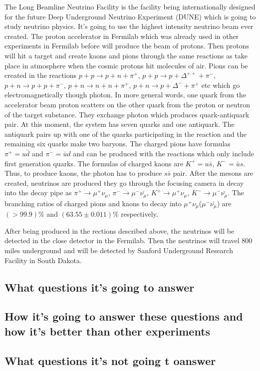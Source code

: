 The Long Beamline Neutrino Facility is the facility being internationally designed for the future Deep Underground Neutrino Experiment (DUNE) which is going to study neutrino physics. It's going to use the highest intensity neutrino beam ever created. The proton accelerator in Fermilab which was already used in other experiments in Fermilab before will produce the beam of protons. Then protons will hit a target and create kaons and pions through the same reactions as take place in atmosphere when the cosmic protons hit molecules of air.  Pions can be created in the reactions $p+p \rightarrow p+n+\pi^+$, $p+p \rightarrow p+\Delta^{++}+\pi^-$, $p+n \rightarrow p+p+\pi^-$, $p+n \rightarrow n+n+\pi^+$, $p+n \rightarrow p+\Delta^{-}+\pi^+$ etc which go electromagnetically though photon. In more general words, one quark from the accelerator beam proton scatters on the other quark from the proton or neutron of the target substance. They exchange photon which produces quark-antiquark pair. At this moment, the system has seven quarks and one antiquark. The antiquark pairs up with one of the quarks participating in the reaction and the remaining six quarks make two baryons.  The charged pions have formulas $\pi^+ = u\bar{d}$ and $\pi^- = \bar{u}d$ and can be produced with the reactions which only include first generation quarks. The formulas of charged kaons are $K^+ = u\bar{s}$, $K^- = \bar{u}s$. Thus, to produce kaons, the photon has to produce $s\bar{s}$ pair. 
After the mesons are created, neutrinos are produced they go through the focusing camera in decay into the decay pipe as $\pi^+ \rightarrow \mu^+\nu_\mu$, $\pi^- \rightarrow \mu^-\bar{\nu_\mu}$, $K^+ \rightarrow \mu^+\nu_\mu$, $K^- \rightarrow \mu^-\bar{\nu_\mu}$. The branching ratios of charged pions and kaons to decay into $\mu^+\nu_\mu$($\mu^-\bar{\nu_\mu}$) are $(>99.9)\%$ and $(63.55\pm0.011)\%$ respectively.

After being produced in the rections described above, the neutrinos will be detected in the close detector in the Fermilab. Then the neutrinos will travel 800 miles underground and will be detected by Sanford Underground Research Facility in South Dakota.  

\subsection{What questions it's going to answer}
\subsection{How it's going to answer these questions and how it's better  than other experiments}
\subsection{What questions it's not going t oanswer}
